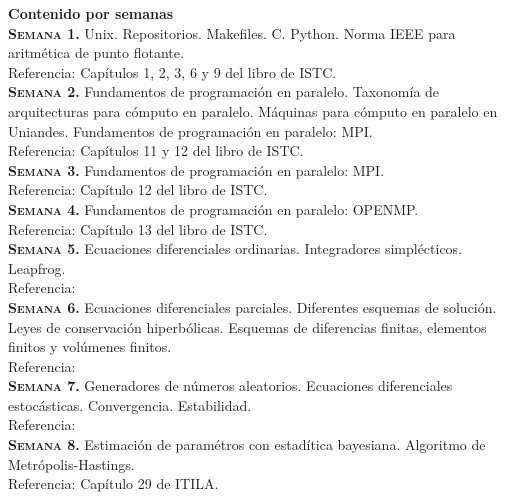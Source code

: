 \documentclass[letterpaper,10pt,onecolumn]{article}
\begin{document}
\noindent\textbf{\large {} \quad Contenido por
  semanas}\\[-0.2cm] 



\noindent\normalsize\textbf{\textsc{Semana 1.}}
Unix. Repositorios. Makefiles. C. Python. Norma IEEE para aritm\'etica de punto
flotante. \\
Referencia: Cap\'itulos 1, 2, 3, 6 y 9 del libro de ISTC.
\\[-0.3cm]

\noindent\textbf{\textsc{Semana 2.}} 
Fundamentos de programaci\'on en paralelo. Taxonom\'ia de arquitecturas
para c\'omputo en paralelo. M\'aquinas para c\'omputo en paralelo en
Uniandes.  Fundamentos de programaci\'on en paralelo: MPI.\\
Referencia: Cap\'itulos 11 y 12 del libro de ISTC.
\\[-0.3cm]  

\noindent\textbf{\textsc{Semana 3.}} 
Fundamentos de programaci\'on en paralelo: MPI.\\
Referencia: Cap\'itulo 12 del libro de ISTC.
\\[-0.3cm]  

\noindent\textbf{\textsc{Semana 4.}} 
Fundamentos de programaci\'on en paralelo: OPENMP.\\
Referencia: Cap\'itulo 13 del libro de ISTC.
\\[-0.3cm]  

\noindent\textbf{\textsc{Semana 5.}}
Ecuaciones diferenciales ordinarias. Integradores simpl\'ecticos. Leapfrog.\\
Referencia:
\\[-0.3cm]

\noindent\textbf{\textsc{Semana 6.}} 
Ecuaciones diferenciales parciales. Diferentes esquemas de
soluci\'on. Leyes de conservaci\'on hiperb\'olicas. Esquemas de
diferencias finitas, elementos finitos y vol\'umenes finitos. \\
Referencia:
\\[-0.3cm]  

\noindent\textbf{\textsc{Semana 7.}} 
Generadores de n\'umeros aleatorios.
Ecuaciones diferenciales estoc\'asticas. Convergencia. Estabilidad.\\
Referencia:
\\[-0.3cm] 

\noindent\textbf{\textsc{Semana 8.}} 
Estimaci\'on de param\'etros con estad\'itica bayesiana. 
Algoritmo de Metr\'opolis-Hastings.\\
Referencia: Cap\'itulo 29 de ITILA.
\\[-0.3cm]   
\end{document}
